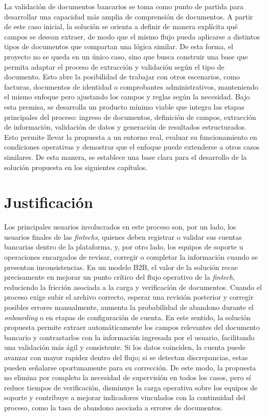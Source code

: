 La validación de documentos bancarios se toma como punto de partida para desarrollar una capacidad más amplia de comprensión de documentos. A partir de este caso inicial, la solución se orienta a definir de manera explícita qué campos se desean extraer, de modo que el mismo flujo pueda aplicarse a distintos tipos de documentos que compartan una lógica similar. De esta forma, el proyecto no se queda en un único caso, sino que busca construir una base que permita adaptar el proceso de extracción y validación según el tipo de documento. Esto abre la posibilidad de trabajar con otros escenarios, como facturas, documentos de identidad o comprobantes administrativos, manteniendo el mismo enfoque pero ajustando los campos y reglas según la necesidad. Bajo esta premisa, se desarrolla un producto mínimo viable que integra las etapas principales del proceso: ingreso de documentos, definición de campos, extracción de información, validación de datos y generación de resultados estructurados. Esto permite llevar la propuesta a un entorno real, evaluar su funcionamiento en condiciones operativas y demostrar que el enfoque puede extenderse a otros casos similares. De esta manera, se establece una base clara para el desarrollo de la solución propuesta en los siguientes capítulos.

\section{Justificación}

Los principales usuarios involucrados en este proceso son, por un lado, los usuarios finales de las \textit{fintechs}, quienes deben registrar o validar sus cuentas bancarias dentro de la plataforma, y, por otro lado, los equipos de soporte u operaciones encargados de revisar, corregir o completar la información cuando se presentan inconsistencias. En un modelo B2B, el valor de la solución recae precisamente en mejorar un punto crítico del flujo operativo de la \textit{fintech}, reduciendo la fricción asociada a la carga y verificación de documentos. Cuando el proceso exige subir el archivo correcto, esperar una revisión posterior y corregir posibles errores manualmente, aumenta la probabilidad de abandono durante el \textit{onboarding} o en etapas de configuración de cuenta. En este sentido, la solución propuesta permite extraer automáticamente los campos relevantes del documento bancario y contrastarlos con la información ingresada por el usuario, facilitando una validación más ágil y consistente. Si los datos coinciden, la cuenta puede avanzar con mayor rapidez dentro del flujo; si se detectan discrepancias, estas pueden señalarse oportunamente para su corrección. De este modo, la propuesta no elimina por completo la necesidad de supervisión en todos los casos, pero sí reduce tiempos de verificación, disminuye la carga operativa sobre los equipos de soporte y contribuye a mejorar indicadores vinculados con la continuidad del proceso, como la tasa de abandono asociada a errores de documentos.

